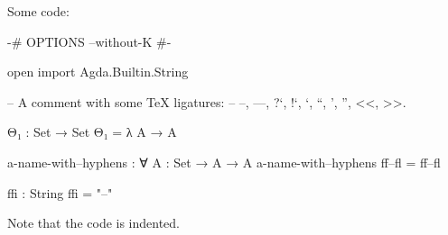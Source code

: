 \documentclass{beamer}
\begin{document}
\begin{frame}
  Some code:
  \begin{code}
  {-# OPTIONS --without-K #-}

  open import Agda.Builtin.String

  -- A comment with some TeX ligatures:
  -- --, ---, ?`, !`, `, ``, ', '', <<, >>.

  Θ₁ : Set → Set
  Θ₁ = λ A → A

  a-name-with--hyphens : ∀ {A : Set} → A → A
  a-name-with--hyphens ff--fl = ff--fl

  ffi : String
  ffi = "--"
  \end{code}
  Note that the code is indented.
\end{frame}
\end{document}
